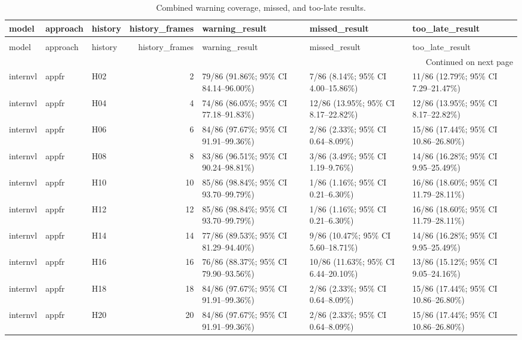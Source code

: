 \begin{longtable}{lllrlll}
\caption{Combined warning coverage, missed, and too-late results.} \label{tab:rq4-interval-independent} \\
\toprule
model & approach & history & history\_frames & warning\_result & missed\_result & too\_late\_result \\
\midrule
\endfirsthead
\caption[]{Combined warning coverage, missed, and too-late results.} \\
\toprule
model & approach & history & history\_frames & warning\_result & missed\_result & too\_late\_result \\
\midrule
\endhead
\midrule
\multicolumn{7}{r}{Continued on next page} \\
\midrule
\endfoot
\bottomrule
\endlastfoot
internvl & appfr & H02 & 2 & 79/86 (91.86\%; 95\% CI 84.14–96.00\%) & 7/86 (8.14\%; 95\% CI 4.00–15.86\%) & 11/86 (12.79\%; 95\% CI 7.29–21.47\%) \\
internvl & appfr & H04 & 4 & 74/86 (86.05\%; 95\% CI 77.18–91.83\%) & 12/86 (13.95\%; 95\% CI 8.17–22.82\%) & 12/86 (13.95\%; 95\% CI 8.17–22.82\%) \\
internvl & appfr & H06 & 6 & 84/86 (97.67\%; 95\% CI 91.91–99.36\%) & 2/86 (2.33\%; 95\% CI 0.64–8.09\%) & 15/86 (17.44\%; 95\% CI 10.86–26.80\%) \\
internvl & appfr & H08 & 8 & 83/86 (96.51\%; 95\% CI 90.24–98.81\%) & 3/86 (3.49\%; 95\% CI 1.19–9.76\%) & 14/86 (16.28\%; 95\% CI 9.95–25.49\%) \\
internvl & appfr & H10 & 10 & 85/86 (98.84\%; 95\% CI 93.70–99.79\%) & 1/86 (1.16\%; 95\% CI 0.21–6.30\%) & 16/86 (18.60\%; 95\% CI 11.79–28.11\%) \\
internvl & appfr & H12 & 12 & 85/86 (98.84\%; 95\% CI 93.70–99.79\%) & 1/86 (1.16\%; 95\% CI 0.21–6.30\%) & 16/86 (18.60\%; 95\% CI 11.79–28.11\%) \\
internvl & appfr & H14 & 14 & 77/86 (89.53\%; 95\% CI 81.29–94.40\%) & 9/86 (10.47\%; 95\% CI 5.60–18.71\%) & 14/86 (16.28\%; 95\% CI 9.95–25.49\%) \\
internvl & appfr & H16 & 16 & 76/86 (88.37\%; 95\% CI 79.90–93.56\%) & 10/86 (11.63\%; 95\% CI 6.44–20.10\%) & 13/86 (15.12\%; 95\% CI 9.05–24.16\%) \\
internvl & appfr & H18 & 18 & 84/86 (97.67\%; 95\% CI 91.91–99.36\%) & 2/86 (2.33\%; 95\% CI 0.64–8.09\%) & 15/86 (17.44\%; 95\% CI 10.86–26.80\%) \\
internvl & appfr & H20 & 20 & 84/86 (97.67\%; 95\% CI 91.91–99.36\%) & 2/86 (2.33\%; 95\% CI 0.64–8.09\%) & 15/86 (17.44\%; 95\% CI 10.86–26.80\%) \\

\end{longtable}
